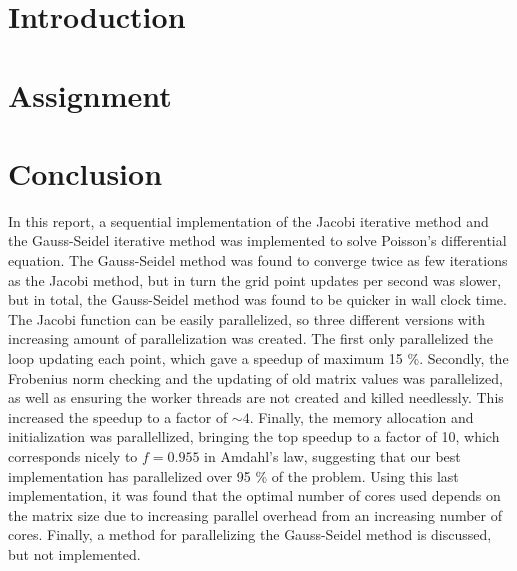


\newpage
\tableofcontents
\thispagestyle{empty}
\setcounter{page}{0}
\newpage
\section{Introduction}


\section{Assignment}











\section{Conclusion}
In this report, a sequential implementation of the Jacobi iterative method and the Gauss-Seidel iterative method was implemented to solve Poisson's differential equation. The Gauss-Seidel method was found to converge twice as few iterations as the Jacobi method, but in turn the grid point updates per second was slower, but in total, the Gauss-Seidel method was found to be quicker in wall clock time. The Jacobi function can be easily parallelized, so three different versions with increasing amount of parallelization was created. The first only parallelized the loop updating each point, which gave a speedup of maximum 15 \%. Secondly, the Frobenius norm checking and the updating of old matrix values was parallelized, as well as ensuring the worker threads are not created and killed needlessly. This increased the speedup to a factor of $\sim 4$. Finally, the memory allocation and initialization was parallellized, bringing the top speedup to a factor of 10, which corresponds nicely to $f = 0.955$ in Amdahl's law, suggesting that our best implementation has parallelized over 95 \% of the problem. Using this last implementation, it was found that the optimal number of cores used depends on the matrix size due to increasing parallel overhead from an increasing number of cores. Finally, a method for parallelizing the Gauss-Seidel method is discussed, but not implemented.

